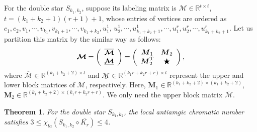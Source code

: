 \documentclass[12pt]{article}
\newtheorem{theorem}{Theorem}[section]
\begin{document}
For the double star $S_{k_{1},k_{2}}$, suppose its labeling matrix is $\boldsymbol{\mathcal{M}}\in \mathbb{R}^{t\times t}$, $t=(k_{1}+k_{2}+1)(r+1)+1$, whose entries of vertices are ordered as $c_{1},c_{2},v_{1},\cdots,v_{k_{1}},v_{k_{1}+1},\cdots,v_{k_{1}+k_{2}},u_{1}^{1}$, $u_{2}^{1},\cdots,u_{k_{1}+k_{2}+1}^{1},\cdots,u_{1}^{r},u_{2}^{r},\cdots,u_{k_{1}+k_{2}+1}^{r}$. Let us partition this matrix by the similar way as follows:
\begin{equation}
\boldsymbol{\mathcal{M}}=\left(\begin{array}{cc}
\overline{\boldsymbol{\mathcal{M}}}\\\underline{\boldsymbol{\mathcal{M}}}
\end{array}\right)
=\left(\begin{array}{cc}
\boldsymbol{M}_{1} & \boldsymbol{M}_{2}\\
\boldsymbol{M}_{2}^{{\rm T}} &\bigstar
\end{array}\right),
\end{equation}
where $\overline{\boldsymbol{\mathcal{M}}}\in \mathbb{R}^{(k_{1}+k_{2}+2)\times t}$ and $\underline{\boldsymbol{\mathcal{M}}}\in \mathbb{R}^{(k_{1}r+k_{2}r+r)\times t}$ represent the upper and lower block matrices of $\boldsymbol{\mathcal{M}}$, respectively. Here,
$\boldsymbol{M}_{1}\in \mathbb{R}^{(k_{1}+k_{2}+2)\times (k_{1}+k_{2}+2)}$, $\boldsymbol{M}_{2}\in \mathbb{R}^{(k_{1}+k_{2}+2)\times(k_{1}r+k_{2}r+r)}$. We only need the upper block matrix $\overline{\boldsymbol{\mathcal{M}}}$.

\begin{theorem}
For the double star $S_{k_{1},k_{2}}$, the local antiamgic chromatic number satisfies $3\leq\chi_{la}(S_{k_{1},k_{2}}\diamond \overline{K_{r}})\leq 4$.
\end{theorem}
\end{document}
